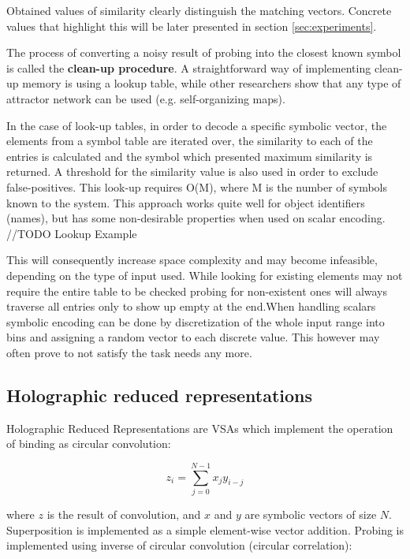 \documentclass[conference]{IEEEtran}
\begin{document}
	Obtained values of similarity clearly distinguish the matching vectors. Concrete values that highlight this will be later presented in section \ref{sec:experiments}.	
	
	The process of converting a noisy result of probing into the closest known symbol is called the \textbf{clean-up procedure}.
A straightforward way of implementing clean-up memory is using a lookup table, while other researchers show that any type of attractor network can be used (e.g. self-organizing maps).

	In the case of look-up tables, in order to decode a specific symbolic vector, the elements from a symbol table are iterated over, the similarity to each of the entries is calculated and the symbol which presented maximum similarity is returned. A threshold for the similarity value is also used in order to exclude false-positives. This look-up requires O(M), where M is the number of symbols known to the system. This approach works quite well for object identifiers (names), but has some non-desirable properties when used on scalar encoding.
	//TODO Lookup Example
	
	This will consequently increase space complexity and may become infeasible, depending on the type of input used. While looking for existing elements may not require the entire table to be checked probing for non-existent ones will always traverse all entries only to show up empty at the end.When handling scalars symbolic encoding can be done by discretization of the whole input range into bins and assigning a random vector to each discrete value. This however may often prove to not satisfy the task needs any more.
	
	\subsection{Holographic reduced representations}
	\label{sec:hrr}
	
	Holographic Reduced Representations are VSAs which implement the operation of binding as circular convolution:
	
	\begin{equation}
	z_i=\sum_{j=0}^{N-1}{x_jy_{i-j}} 
	\end{equation}
	
	where $z$ is the result of convolution, and $x$ and $y$ are symbolic vectors of size $N$.
Superposition is implemented as a simple element-wise vector addition.
Probing is implemented using inverse of circular convolution (circular correlation):
	
\end{document}
